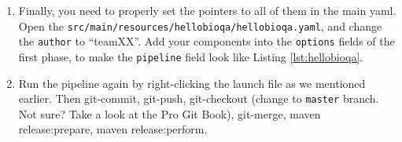 \begin{enumerate}
\item Finally, you need to properly set the pointers to all of them in the main
yaml. Open the \texttt{src/main/resources/hellobioqa/hellobioqa.yaml}, and
change the \texttt{author} to ``teamXX''. Add your components into the
\verb|options| fields of the first phase, to make the \verb|pipeline| field look
like Listing \ref{lst:hellobioqa}.



\item Run the pipeline again by right-clicking the launch file as we mentioned
earlier. Then git-commit, git-push, git-checkout (change to \texttt{master}
branch. Not sure? Take a look at the Pro Git Book), git-merge, maven
release:prepare, maven release:perform.

\end{enumerate}